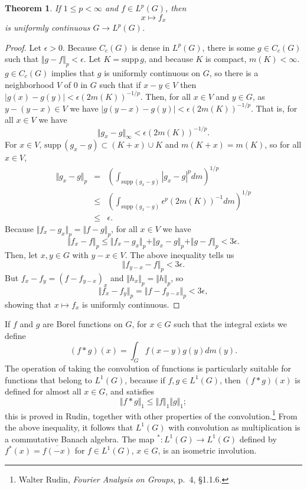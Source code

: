 \documentclass{article}
\newcommand{\supp}{\mathrm{supp}\,}
\newcommand{\norm}[1]{\Vert #1 \Vert}
\newtheorem{theorem}{Theorem}
\begin{document}
\begin{theorem}
If $1 \leq p < \infty$ and $f \in L^p(G)$, then
\[
x \mapsto f_x
\]
is uniformly continuous $G \to L^p(G)$.
\end{theorem}
\begin{proof}
Let $\epsilon>0$. Because $C_c(G)$ is dense in $L^p(G)$, there is some $g \in C_c(G)$ such that 
$\norm{g-f}_p < \epsilon$. Let $K = \supp g$, and because $K$ is compact, $m(K)<\infty$. $g \in C_c(G)$ implies that $g$ is uniformly continuous on $G$, so there
is a neighborhood $V$ of $0$ in $G$ such that if $x-y \in V$ then $|g(x)-g(y)|<\epsilon (2m(K))^{-1/p}$. Then, for all $x \in V$ and $y \in G$, as $y-(y-x) \in V$ we have
$|g(y-x)-g(y)|<\epsilon (2m(K))^{-1/p}$. That is, for all $x \in V$ we have
\[
\norm{g_x-g}_\infty < \epsilon (2m(K))^{-1/p}.
\]
For $x \in V$, $\supp (g_x-g) \subset (K+x) \cup K$ and $m(K+x)=m(K)$, so for all $x \in V$,
\begin{eqnarray*}
\norm{g_x-g}_p &=& \left( \int_{\supp(g_x-g)} |g_x-g|^p dm \right)^{1/p}\\
& \leq& \left( \int_{\supp(g_x-g)}  \epsilon^p (2m(K))^{-1} dm\right)^{1/p}\\
&\leq&\epsilon.
\end{eqnarray*}
Because $\norm{f_x-g_x}_p=\norm{f-g}_p$, for all $x \in V$ we have
\[
\norm{f_x-f}_p \leq \norm{f_x-g_x}_p+\norm{g_x-g}_p+\norm{g-f}_p < 3\epsilon.
\]
Then, let $x,y \in G$ with $y-x \in V$. The above inequality tells us
\[
\norm{f_{y-x}-f}_p < 3\epsilon.
\]
But $f_x-f_y = (f-f_{y-x})_x$ and $\norm{h_x}_p=\norm{h}_p$, so
\[
\norm{f_x-f_y}_p =\norm{f-f_{y-x}}_p < 3\epsilon,
\]
showing that $x \mapsto f_x$ is uniformly continuous.
\end{proof}

If $f$ and $g$ are  Borel functions on $G$, for $x \in G$ such that the integral exists we define
\[
(f*g)(x) = \int_G f(x-y) g(y) dm(y).
\]
The operation of taking the convolution of functions is particularly suitable for functions that belong
to $L^1(G)$, because if $f,g \in L^1(G)$, then $(f*g)(x)$ is defined for almost all $x \in G$, and satisfies
\[
\norm{f*g}_1 \leq \norm{f}_1 \norm{g}_1;
\]
this is proved in Rudin, together with other properties of the convolution.\footnote{Walter
Rudin, {\em Fourier Analysis on Groups}, p.~4, \S 1.1.6.} From the above inequality, it follows that $L^1(G)$ with convolution as multiplication
is a commutative Banach algebra. The map $^*:L^1(G) \to L^1(G)$ defined by $f^*(x)=\overline{f(-x)}$ for $f \in L^1(G)$, $x \in G$,
is an isometric involution.
\end{document}
